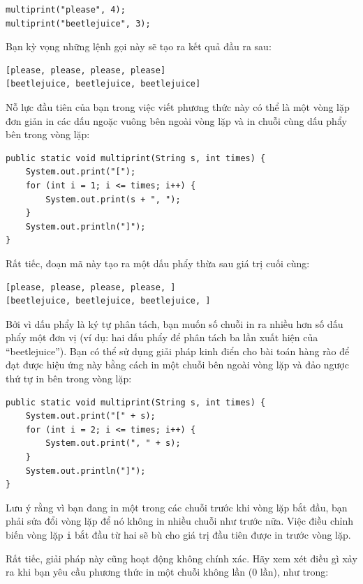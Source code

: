 \begin{verbatim}
multiprint("please", 4);
multiprint("beetlejuice", 3);
\end{verbatim}


Bạn kỳ vọng những lệnh gọi này sẽ tạo ra kết quả đầu ra sau:
 
\begin{verbatim}
[please, please, please, please] 
[beetlejuice, beetlejuice, beetlejuice] 
\end{verbatim}


Nỗ lực đầu tiên của bạn trong việc viết phương thức này có thể là một vòng lặp đơn giản in các dấu ngoặc vuông bên ngoài vòng lặp và in chuỗi cùng dấu phẩy bên trong vòng lặp:

\begin{verbatim}
public static void multiprint(String s, int times) {
    System.out.print("[");
    for (int i = 1; i <= times; i++) {
        System.out.print(s + ", ");
    }
    System.out.println("]");
}
\end{verbatim}


Rất tiếc, đoạn mã này tạo ra một dấu phẩy thừa sau giá trị cuối cùng:
 
\begin{verbatim}
[please, please, please, please, ] 
[beetlejuice, beetlejuice, beetlejuice, ] 
\end{verbatim}


Bởi vì dấu phẩy là ký tự phân tách, bạn muốn số chuỗi in ra nhiều hơn số dấu phẩy một đơn vị (ví dụ: hai dấu phẩy để phân tách ba lần xuất hiện của ``beetlejuice''). Bạn có thể sử dụng giải pháp kinh điển cho bài toán hàng rào để đạt được hiệu ứng này bằng cách in một chuỗi bên ngoài vòng lặp và đảo ngược thứ tự in bên trong vòng lặp:

\begin{verbatim}
public static void multiprint(String s, int times) {
    System.out.print("[" + s);
    for (int i = 2; i <= times; i++) {
        System.out.print(", " + s);
    }
    System.out.println("]");
}
\end{verbatim}


Lưu ý rằng vì bạn đang in một trong các chuỗi trước khi vòng lặp bắt đầu, bạn phải sửa đổi vòng lặp để nó không in nhiều chuỗi như trước nữa. Việc điều chỉnh biến vòng lặp \texttt{i} bắt đầu từ hai sẽ bù cho giá trị đầu tiên được in trước vòng lặp.

Rất tiếc, giải pháp này cũng hoạt động không chính xác. Hãy xem xét điều gì xảy ra khi bạn yêu cầu phương thức in một chuỗi không lần (0 lần), như trong:

